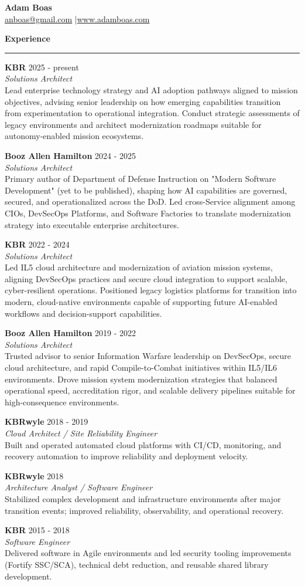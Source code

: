 \documentclass[10pt]{article}
\newcommand{\ResumeSection}[1]{\vspace{0.16em}\noindent\textbf{\large #1}\par\nointerlineskip\textcolor{accentgold}{\rule{\textwidth}{0.75pt}}\vspace{-0.08em}}
\newcommand{\Role}[4]{\textbf{#1} \hfill #3\\\textit{#2}\\#4\par\vspace{0.20em}}
\begin{document}
\setlength{\parskip}{0.18em}

\begin{center}
{\LARGE\bfseries Adam Boas}\\
\small \href{mailto:anboas@gmail.com}{anboas@gmail.com} \quad|\quad \href{https://www.adamboas.com}{www.adamboas.com}
\end{center}

\ResumeSection{Experience}
\Role{KBR}{Solutions Architect}{2025 - present}{Lead enterprise technology strategy and AI adoption pathways aligned to mission objectives, advising senior leadership on how emerging capabilities transition from experimentation to operational integration. Conduct strategic assessments of legacy environments and architect modernization roadmaps suitable for autonomy-enabled mission ecosystems.}
\Role{Booz Allen Hamilton}{Solutions Architect}{2024 - 2025}{Primary author of Department of Defense Instruction on "Modern Software Development" (yet to be published), shaping how AI capabilities are governed, secured, and operationalized across the DoD. Led cross-Service alignment among CIOs, DevSecOps Platforms, and Software Factories to translate modernization strategy into executable enterprise architectures.}
\Role{KBR}{Solutions Architect}{2022 - 2024}{Led IL5 cloud architecture and modernization of aviation mission systems, aligning DevSecOps practices and secure cloud integration to support scalable, cyber-resilient operations. Positioned legacy logistics platforms for transition into modern, cloud-native environments capable of supporting future AI-enabled workflows and decision-support capabilities.}
\Role{Booz Allen Hamilton}{Solutions Architect}{2019 - 2022}{Trusted advisor to senior Information Warfare leadership on DevSecOps, secure cloud architecture, and rapid Compile-to-Combat initiatives within IL5/IL6 environments. Drove mission system modernization strategies that balanced operational speed, accreditation rigor, and scalable delivery pipelines suitable for high-consequence environments.}
\Role{KBRwyle}{Cloud Architect / Site Reliability Engineer}{2018 - 2019}{Built and operated automated cloud platforms with CI/CD, monitoring, and recovery automation to improve reliability and deployment velocity.}
\Role{KBRwyle}{Architecture Analyst / Software Engineer}{2018}{Stabilized complex development and infrastructure environments after major transition events; improved reliability, observability, and operational recovery.}
\Role{KBR}{Software Engineer}{2015 - 2018}{Delivered software in Agile environments and led security tooling improvements (Fortify SSC/SCA), technical debt reduction, and reusable shared library development.}
\end{document}
